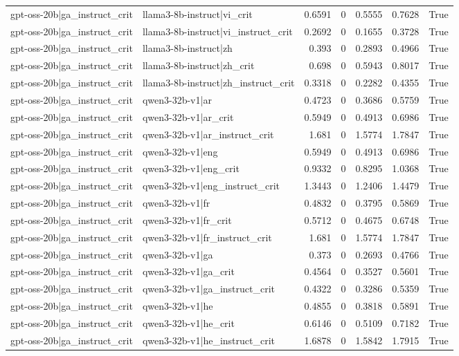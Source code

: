 \begin{table}
\begin{tabular}{l l r r r r l}
gpt-oss-20b|ga_instruct_crit & llama3-8b-instruct|vi_crit & 0.6591 & 0 & 0.5555 & 0.7628 & True \\
gpt-oss-20b|ga_instruct_crit & llama3-8b-instruct|vi_instruct_crit & 0.2692 & 0 & 0.1655 & 0.3728 & True \\
gpt-oss-20b|ga_instruct_crit & llama3-8b-instruct|zh & 0.393 & 0 & 0.2893 & 0.4966 & True \\
gpt-oss-20b|ga_instruct_crit & llama3-8b-instruct|zh_crit & 0.698 & 0 & 0.5943 & 0.8017 & True \\
gpt-oss-20b|ga_instruct_crit & llama3-8b-instruct|zh_instruct_crit & 0.3318 & 0 & 0.2282 & 0.4355 & True \\
gpt-oss-20b|ga_instruct_crit & qwen3-32b-v1|ar & 0.4723 & 0 & 0.3686 & 0.5759 & True \\
gpt-oss-20b|ga_instruct_crit & qwen3-32b-v1|ar_crit & 0.5949 & 0 & 0.4913 & 0.6986 & True \\
gpt-oss-20b|ga_instruct_crit & qwen3-32b-v1|ar_instruct_crit & 1.681 & 0 & 1.5774 & 1.7847 & True \\
gpt-oss-20b|ga_instruct_crit & qwen3-32b-v1|eng & 0.5949 & 0 & 0.4913 & 0.6986 & True \\
gpt-oss-20b|ga_instruct_crit & qwen3-32b-v1|eng_crit & 0.9332 & 0 & 0.8295 & 1.0368 & True \\
gpt-oss-20b|ga_instruct_crit & qwen3-32b-v1|eng_instruct_crit & 1.3443 & 0 & 1.2406 & 1.4479 & True \\
gpt-oss-20b|ga_instruct_crit & qwen3-32b-v1|fr & 0.4832 & 0 & 0.3795 & 0.5869 & True \\
gpt-oss-20b|ga_instruct_crit & qwen3-32b-v1|fr_crit & 0.5712 & 0 & 0.4675 & 0.6748 & True \\
gpt-oss-20b|ga_instruct_crit & qwen3-32b-v1|fr_instruct_crit & 1.681 & 0 & 1.5774 & 1.7847 & True \\
gpt-oss-20b|ga_instruct_crit & qwen3-32b-v1|ga & 0.373 & 0 & 0.2693 & 0.4766 & True \\
gpt-oss-20b|ga_instruct_crit & qwen3-32b-v1|ga_crit & 0.4564 & 0 & 0.3527 & 0.5601 & True \\
gpt-oss-20b|ga_instruct_crit & qwen3-32b-v1|ga_instruct_crit & 0.4322 & 0 & 0.3286 & 0.5359 & True \\
gpt-oss-20b|ga_instruct_crit & qwen3-32b-v1|he & 0.4855 & 0 & 0.3818 & 0.5891 & True \\
gpt-oss-20b|ga_instruct_crit & qwen3-32b-v1|he_crit & 0.6146 & 0 & 0.5109 & 0.7182 & True \\
gpt-oss-20b|ga_instruct_crit & qwen3-32b-v1|he_instruct_crit & 1.6878 & 0 & 1.5842 & 1.7915 & True \\

\end{tabular}
\end{table}
